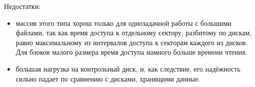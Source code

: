 \begin {itemize}
Недостатки:
\begin {itemize}
\item массив этого типа хорош только для однозадачной работы с большими файлами, так как время доступа к отдельному сектору, разбитому по дискам, равно максимальному из интервалов доступа к секторам каждого из дисков. Для блоков малого размера время доступа намного больше времени чтения.
\item большая нагрузка на контрольный диск, и, как следствие, его надёжность сильно падает по сравнению с дисками, хранящими данные.
\end {itemize}

\begin{figure}[h!]
\begin{minipage}[h]{0.3\linewidth}
\end{minipage}
\hfill
\begin{minipage}[h]{0.3\linewidth}

\end{minipage}
\end{figure}
\end{itemize}
